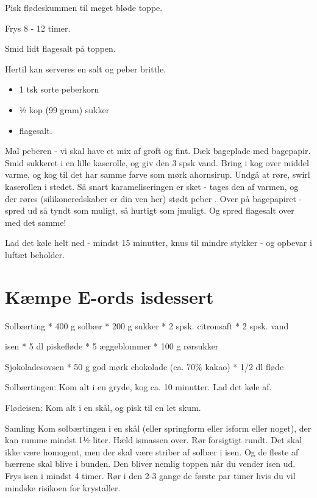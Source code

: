 \documentclass[
]{book}
\providecommand{\tightlist}{%
  \setlength{\itemsep}{0pt}\setlength{\parskip}{0pt}}
\begin{document}
Pisk flødeskummen til meget bløde toppe.

Frys 8 - 12 timer.

Smid lidt flagesalt på toppen.

Hertil kan serveres en salt og peber brittle.

\begin{itemize}
\tightlist
\item
  1 tsk sorte peberkorn
\item
  ½ kop (99 gram) sukker
\item
  flagesalt.
\end{itemize}

Mal peberen - vi skal have et mix af groft og fint.
Dæk bageplade med bagepapir.
Smid sukkeret i en lille kaserolle, og giv den 3
spsk vand. Bring i kog over middel varme,
og kog til det har samme farve som mørk ahornsirup.
Undgå at røre, swirl kaserollen i stedet.
Så snart karameliseringen er sket - tages den af varmen, og der røres (silikoneredskaber er din ven her) stødt peber . Over på bagepapiret - spred ud så tyndt som muligt, så hurtigt som jmuligt. Og spred
flagesalt over med det samme!

Lad det køle helt ned - mindst 15 minutter, knus til mindre stykker - og opbevar i luftæt beholder.

\hypertarget{kuxe6mpe-e-ords-isdessert}{%
\section{Kæmpe E-ords isdessert}\label{kuxe6mpe-e-ords-isdessert}}

Solbærting
* 400 g solbær
* 200 g sukker
* 2 spsk. citronsaft
* 2 spsk. vand

isen
* 5 dl piskefløde
* 5 æggeblommer
* 100 g rørsukker

Sjokoladesovsen
* 50 g god mørk chokolade (ca. 70\% kakao)
* 1/2 dl fløde

Solbærtingen:
Kom alt i en gryde, kog ca. 10 minutter. Lad det køle af.

Flødeisen:
Kom alt i en skål, og pisk til en let skum.

Samling
Kom solbærtingen i en skål (eller springform eller isform eller noget), der kan rumme
mindst 1½ liter. Hæld ismassen over. Rør forsigtigt rundt. Det skal ikke være
homogent, men der skal være striber af solbær i isen. Og de fleste af bærrene
skal blive i bunden. Den bliver nemlig toppen når du vender isen ud.
Frys isen i mindst 4 timer. Rør i den 2-3 gange de første par timer
hvis du vil mindske risikoen for krystaller.
\end{document}
